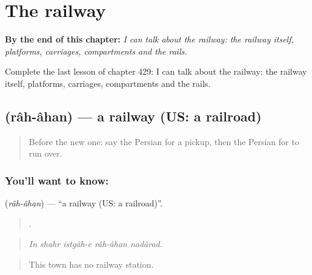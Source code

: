 
\chapter{The railway}
\label{ch:fa-the-railway}

\begin{chapteropening}
\textbf{By the end of this chapter:} \emph{I can talk about the railway: the railway itself, platforms, carriages, compartments and the rails.}

Complete the last lesson of chapter 429: I can talk about the railway: the railway itself, platforms, carriages, compartments and the rails.
\end{chapteropening}

\section[\texorpdfstring{\fa{راه} \fa{آهن} (râh-âhan)}{راه آهن (râh-âhan)}]{  (râh-âhan) — a railway (US: a railroad)}

\label{lesson:FA-C429-rah-ahan}



\begin{quote}
Before the new one: say the Persian for a pickup, then the Persian for to run over.
\end{quote}

\subsection*{You'll want to know:  }
\textbf{ } (\emph{râh-âhan}) — \textquotedblleft{}a railway (US: a railroad)\textquotedblright{}.

\begin{quote}
     .
\end{quote}

\begin{quote}
\emph{In shahr istgâh-e râh-âhan nadârad.}
\end{quote}

\begin{quote}
This town has no railway station.
\end{quote}

